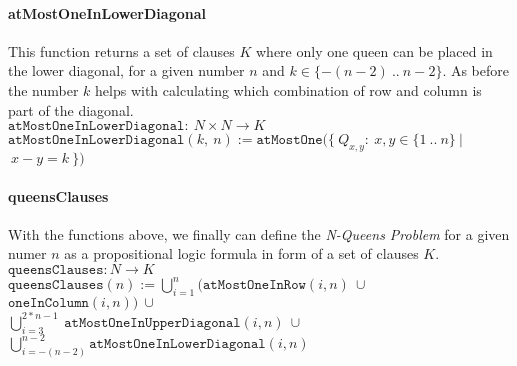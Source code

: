 \paragraph{atMostOneInLowerDiagonal}
This function returns a set of clauses $K$ where only one queen can be placed in the lower diagonal, for a given number $n$ and $k \in \{-(n - 2)\ ..\ n - 2\}$. As before the number $k$ helps with calculating which combination of row and column is part of the diagonal.
\\[0.2cm]
\hspace*{1.3cm} $\texttt{atMostOneInLowerDiagonal}:\ N \times N \to K$
\\[0.2cm]
\hspace*{1.3cm} $\texttt{atMostOneInLowerDiagonal}(k,\ n) := \texttt{atMostOne}(\{\ Q_{x,y} :\ x,y \in \{1\ ..\ n\}\ |$
\hspace*{11.5cm} $\ x - y = k\ \})$

\paragraph{queensClauses}
With the functions above, we finally can define the \textit{N-Queens Problem} for a given numer $n$ as a propositional logic formula in form of a set of clauses $K$.
\\[0.2cm]
\hspace*{1.3cm} $\texttt{queensClauses}:  N \to K$
\\[0.2cm]
\hspace*{1.3cm} $\texttt{queensClauses}(n) := \bigcup\limits_{i=1}^{n}(\texttt{atMostOneInRow}(i, n)\ \cup\ $
$\texttt{oneInColumn}(i, n))\ \cup\ $
\\[0.1cm]
\hspace*{6.1cm} $\bigcup\limits_{i=3}^{2 * n - 1}\ \texttt{atMostOneInUpperDiagonal}(i, n)\ \cup\ $
\\[0.1cm]
\hspace*{5.8cm} $\bigcup\limits_{i=-(n - 2)}^{n - 2}\texttt{atMostOneInLowerDiagonal}(i, n)$